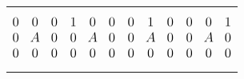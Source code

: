 \begin{tabular}{m{8em} m{10em} m{10em} m{8em}}
	\begin{equation*}
		\large
		\begin{matrix}
			0 & 0 & 0\\
			0 & A & 0\\
			0 & 0 & 0 \\
		\end{matrix}
	\end{equation*}
	&
	\begin{equation*}
		\large
		\begin{matrix}
			1 & 0 & 0\\
			0 & A & 0\\
			0 & 0 & 0 \\
		\end{matrix}
	\end{equation*}
	&
	\begin{equation*}
		\large
		\begin{matrix}
			0 & 1 & 0\\
			0 & A & 0\\
			0 & 0 & 0 \\
		\end{matrix}
	\end{equation*}
	&
	\begin{equation*}
		\large
		\begin{matrix}
			0 & 0 & 1\\
			0 & A & 0\\
			0 & 0 & 0 \\
		\end{matrix}
	\end{equation*} \\


\end{tabular}
